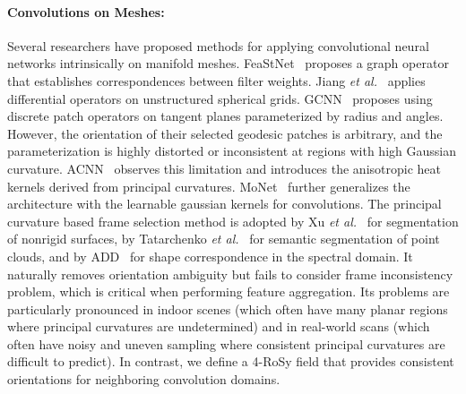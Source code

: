 \paragraph*{Convolutions on Meshes:}
Several researchers have proposed methods for applying convolutional neural networks intrinsically on manifold meshes.  FeaStNet~\cite{verma2018feastnet} proposes a graph operator that establishes correspondences between filter weights. Jiang \textit{et al.}~\cite{jiang2019spherical} applies differential operators on unstructured spherical grids.
GCNN~\cite{masci2015geodesic} proposes using discrete patch operators on tangent planes parameterized by radius and angles. 
However, the orientation of their selected geodesic patches is arbitrary, and the parameterization is highly distorted or inconsistent at regions with high Gaussian curvature. 
ACNN~\cite{boscaini2016learning} observes this limitation and introduces the anisotropic heat kernels derived from principal curvatures. MoNet~\cite{monti2017geometric} further generalizes the architecture with the learnable gaussian kernels for convolutions.
The principal curvature based frame selection method is adopted by Xu \textit{et al.}~\cite{xu2017directionally} for segmentation of nonrigid surfaces, by Tatarchenko \textit{et al.}~\cite{tatarchenko2018tangent} for semantic segmentation of point clouds, and by ADD~\cite{boscaini2016anisotropic} for shape correspondence in the spectral domain. 
It naturally removes orientation ambiguity but fails to consider frame inconsistency problem, which is critical when performing feature aggregation.  Its problems are particularly pronounced in indoor scenes (which often have many planar regions where principal curvatures are undetermined) and in real-world scans (which often have noisy and uneven sampling where consistent principal curvatures are difficult to predict).   In contrast, we define a 4-RoSy field that provides consistent orientations for neighboring convolution domains.

